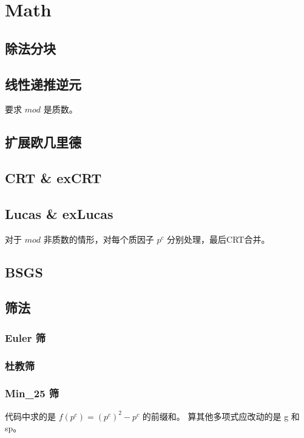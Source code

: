 \documentclass[../template.tex]{subfiles}
\begin{document}
\section{Math}

\subsection{除法分块}

\subsection{线性递推逆元}
	要求 $mod$ 是质数。

\subsection{扩展欧几里德}

\subsection{CRT \& exCRT}

\subsection{Lucas \& exLucas}
	对于 $mod$ 非质数的情形，对每个质因子 $p^c$ 分别处理，最后CRT合并。
	

\subsection{BSGS}

\subsection{筛法}
	\subsubsection{Euler 筛}
	\subsubsection{杜教筛}
	\subsubsection{Min\_25 筛}
		代码中求的是 $f(p^c)=(p^c)^2-p^c$ 的前缀和。
		算其他多项式应改动的是 g 和 sp。
\end{document}
